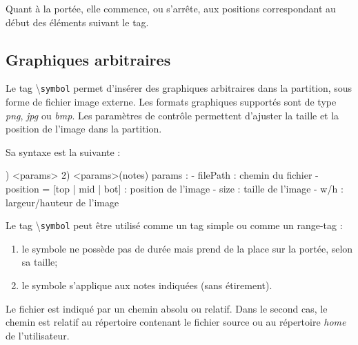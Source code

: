 \documentclass{article}
\newenvironment{gmncode}	{\vspace{-2mm}\small\verbatim}{\endverbatim\vspace{-2mm}}
\newcommand{\code}[1]		{{\small \texttt{#1}}}
\newcommand{\guidotag}[1]	{\textbackslash\code{#1}}
\begin{document}
Quant à la portée, elle commence, ou s'arrête, aux positions correspondant au début des éléments suivant le tag.


\subsection{Graphiques arbitraires}\label{subsec:graphiquesAbstraites}

Le tag \guidotag{symbol} permet d'insérer des graphiques arbitraires dans la partition, sous forme de fichier image externe. Les formats graphiques supportés sont de type \emph{png}, \emph{jpg} ou \emph{bmp}. Les paramètres de contrôle permettent d'ajuster la taille et la position de l'image dans la partition.

Sa syntaxe est la suivante :

\vspace{1mm}

\begin{gmncode}
1) \symbol<params>
2) \symbol<params>(notes)
  params : 
    - filePath : chemin du fichier
    - position = [top | mid | bot] :
      position de l'image
    - size : taille de l'image
    - w/h : largeur/hauteur de l'image
\end{gmncode}

\vspace{1mm}

Le tag \guidotag{symbol} peut être utilisé comme un tag simple ou comme un range-tag :
\begin{enumerate}
	\item le symbole ne possède pas de durée mais prend de la place sur la portée, selon sa taille;
	\item le symbole s'applique aux notes indiquées (sans étirement).
\end{enumerate}

Le fichier est indiqué par un chemin absolu ou relatif. Dans le second cas, le chemin est relatif au répertoire contenant le fichier source ou au répertoire \emph{home} de l'utilisateur.
\end{document}
